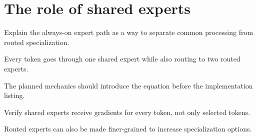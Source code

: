 \section{The role of shared experts}
\label{sec:ch08-the-role-of-shared-experts}

Explain the always-on expert path as a way to separate common processing from routed specialization.



Every token goes through one shared expert while also routing to two routed experts.



The planned mechanics should introduce the equation before the implementation listing.





\begin{checkpointbox}
Verify shared experts receive gradients for every token, not only selected tokens.
\end{checkpointbox}

Routed experts can also be made finer-grained to increase specialization options.
